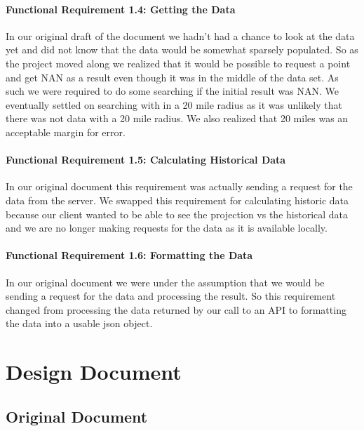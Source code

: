 \documentclass[onecolumn, draftclsnofoot,10pt, compsoc]{article}
\begin{document}
		    \paragraph{Functional Requirement 1.4: Getting the Data}
		    In our original draft of the document we hadn't had a chance to look at the data yet and did not know that the data would be somewhat sparsely populated. So as the project moved along we realized that it would be possible to request a point and get NAN as a result even though it was in the middle of the data set. As such we were required to do some searching if the initial result was NAN. We eventually settled on searching with in a 20 mile radius as it was unlikely that there was not data with a 20 mile radius. We also realized that 20 miles was an acceptable margin for error.\\
		    
		    \paragraph{Functional Requirement 1.5: Calculating Historical Data}
		    In our original document this requirement was actually sending a request for the data from the server. We swapped this requirement for calculating historic data because our client wanted to be able to see the projection vs the historical data and we are no longer making requests for the data as it is available locally.\\
		    
		    \paragraph{Functional Requirement 1.6: Formatting the Data}
		    In our original document we were under the assumption that we would be sending a request for the data and processing the result. So this requirement changed from processing the data returned by our call to an API to formatting the data into a usable json object.\\
		   
\section{Design Document}
    \subsection{Original Document}
        
\end{document}
